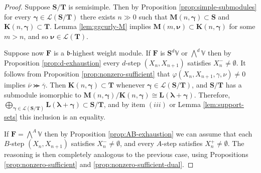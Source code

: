 \documentclass[11pt,fleqn]{amsart}
\renewcommand\phi{\varphi}
\theoremstyle{definition}
\theoremstyle{remark}
\theoremstyle{remark}
\newcommand\VV{\mathbb V}
\renewcommand\SS{\mathbf S}
\newcommand\lie[1]{\mathfrak{#1}}
\newcommand\wt[1]{\boldsymbol{#1}}
\newcommand\map[4]{\phi(#3,#4,#1,#2)}
\begin{document}
\begin{proof}
Suppose $\mathbf S/\mathbf T$ is semisimple. Then by Proposition 
\ref{prop:simple-submodules} for every $\wt\gamma \in \mathcal L(\mathbf S/
\mathbf T)$ there exists $n \gg 0$ such that $\mathbf M(n,\wt\gamma) \subset 
\mathbf S$ and $\mathbf K(n, \wt\gamma) \subset \mathbf T $. Lemma 
\ref{lem:ggcurly-M} implies $\mathbf M(m,\wt\nu) \subset \mathbf K(n,
\wt\gamma)$ for some $m > n$, and so $\wt\nu \in \mathcal L(\mathbf T)$. 

Suppose now $\mathbf F$ is a $\lie b$-highest weight module. If $\mathbf F$ is 
$\SS^d\VV$ or $\bigwedge^d \VV$ then by Proposition
\ref{prop:d-exhaustion} every $d$-step $(X_n, X_{n+1})$ satisfies $X_n^- \neq 
\emptyset$. It follows from Proposition \ref{prop:nonzero-sufficient} that
$\map{\gamma}{\nu}{X_n}{X_{n+1}} \neq 0$ implies $\overline \nu \ggcurly 
\overline \gamma$. Then $\mathbf K(n,\wt\gamma) \subset \mathbf T$ whenever 
$\wt\gamma \in \mathcal L(\mathbf S/\mathbf T)$, and $\mathbf S / \mathbf T$ 
has a submodule isomorphic to $\mathbf M(n,\wt\gamma)/ \mathbf K(n,
\wt\gamma) \cong \mathbf L(\wt\lambda + \wt\gamma)$. Therefore,
$\bigoplus_{\wt\gamma \in \mathcal L(\mathbf S/\mathbf T)} \mathbf L(\wt\lambda 
+ \wt\gamma) \subset \mathbf S / \mathbf T$, and by item $(iii)$ or Lemma 
\ref{lem:support-sets} this inclusion is an equality.

If $\mathbf F = \bigwedge^A \VV$ then by Proposition \ref{prop:AB-exhaustion} 
we can assume that each $B$-step $(X_n, X_{n+1})$ satisfies $X_n^- \neq 
\emptyset$, and every $A$-step satisfies $X_n^+ \neq \emptyset$. The reasoning 
is then completely analogous to the previous case, using Propositions 
\ref{prop:nonzero-sufficient} and \ref{prop:nonzero-sufficient-dual}. 
\end{proof}
\end{document}
